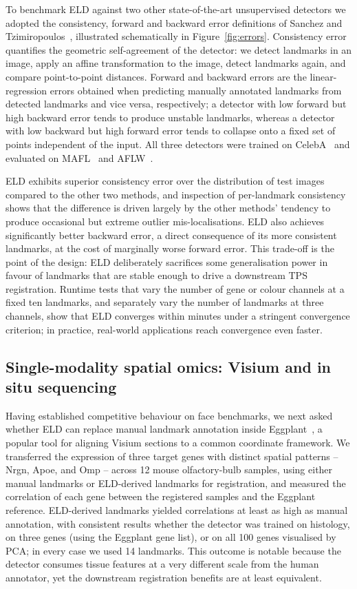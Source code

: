 \documentclass[11pt]{article}
\begin{document}
To benchmark ELD against two other state-of-the-art unsupervised detectors we adopted the consistency, forward and backward error definitions of Sanchez and Tzimiropoulos~\cite{sanchez2019object}, illustrated schematically in Figure~\ref{fig:errors}. Consistency error quantifies the geometric self-agreement of the detector: we detect landmarks in an image, apply an affine transformation to the image, detect landmarks again, and compare point-to-point distances. Forward and backward errors are the linear-regression errors obtained when predicting manually annotated landmarks from detected landmarks and vice versa, respectively; a detector with low forward but high backward error tends to produce unstable landmarks, whereas a detector with low backward but high forward error tends to collapse onto a fixed set of points independent of the input. All three detectors were trained on CelebA~\cite{liu2015celeba} and evaluated on MAFL~\cite{zhang2016learning} and AFLW~\cite{kostinger2011aflw}.

ELD exhibits superior consistency error over the distribution of test images compared to the other two methods, and inspection of per-landmark consistency shows that the difference is driven largely by the other methods' tendency to produce occasional but extreme outlier mis-localisations. ELD also achieves significantly better backward error, a direct consequence of its more consistent landmarks, at the cost of marginally worse forward error. This trade-off is the point of the design: ELD deliberately sacrifices some generalisation power in favour of landmarks that are stable enough to drive a downstream TPS registration. Runtime tests that vary the number of gene or colour channels at a fixed ten landmarks, and separately vary the number of landmarks at three channels, show that ELD converges within minutes under a stringent convergence criterion; in practice, real-world applications reach convergence even faster.

\subsection{Single-modality spatial omics: Visium and in situ sequencing}

Having established competitive behaviour on face benchmarks, we next asked whether ELD can replace manual landmark annotation inside Eggplant~\cite{bergenstrahle2021eggplant}, a popular tool for aligning Visium sections to a common coordinate framework. We transferred the expression of three target genes with distinct spatial patterns -- Nrgn, Apoe, and Omp -- across 12 mouse olfactory-bulb samples, using either manual landmarks or ELD-derived landmarks for registration, and measured the correlation of each gene between the registered samples and the Eggplant reference. ELD-derived landmarks yielded correlations at least as high as manual annotation, with consistent results whether the detector was trained on histology, on three genes (using the Eggplant gene list), or on all 100 genes visualised by PCA; in every case we used 14 landmarks. This outcome is notable because the detector consumes tissue features at a very different scale from the human annotator, yet the downstream registration benefits are at least equivalent.
\end{document}
